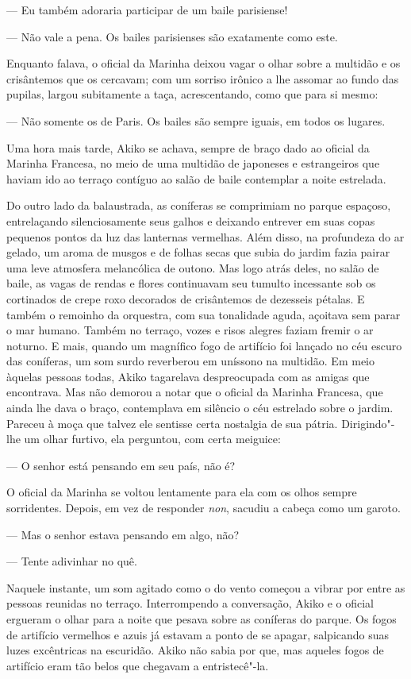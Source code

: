 --- Eu também adoraria participar de um baile parisiense!

--- Não vale a pena. Os bailes parisienses são exatamente como este.

Enquanto falava, o oficial da Marinha deixou vagar o olhar sobre a
multidão e os crisântemos que os cercavam; com um sorriso irônico a lhe
assomar ao fundo das pupilas, largou subitamente a taça, acrescentando,
como que para si mesmo:

--- Não somente os de Paris. Os bailes são sempre iguais, em todos os
lugares.

Uma hora mais tarde, Akiko se achava, sempre de braço dado ao oficial da 
Marinha Francesa, no meio de uma multidão de japoneses e estrangeiros
que haviam ido ao terraço contíguo ao salão de baile contemplar a noite
estrelada.

Do outro lado da balaustrada, as coníferas se comprimiam no parque
espaçoso, entrelaçando silenciosamente seus galhos e deixando entrever
em suas copas pequenos pontos da luz das lanternas vermelhas. Além
disso, na profundeza do ar gelado, um aroma de musgos e de folhas secas
que subia do jardim fazia pairar uma leve atmosfera melancólica de
outono. Mas logo atrás deles, no salão de baile, as vagas de rendas e
flores continuavam seu tumulto incessante sob os cortinados de crepe
roxo decorados de crisântemos de dezesseis pétalas. E também o remoinho
da orquestra, com sua tonalidade aguda, açoitava sem parar o mar
humano. Também no terraço, vozes e risos alegres faziam fremir o ar
noturno. E mais, quando um magnífico fogo de artifício foi lançado no
céu escuro das coníferas, um som surdo reverberou em uníssono na
multidão. Em meio àquelas pessoas todas, Akiko tagarelava despreocupada
com as amigas que encontrava. Mas não demorou a notar que o oficial da
Marinha Francesa, que ainda lhe dava o braço, contemplava em silêncio o
céu estrelado sobre o jardim. Pareceu à moça que talvez ele sentisse
certa nostalgia de sua pátria. Dirigindo"-lhe um olhar furtivo, ela
perguntou, com certa meiguice:

--- O senhor está pensando em seu país, não é?

O oficial da Marinha se voltou lentamente para ela com os olhos sempre
sorridentes. Depois, em vez de responder \textit{non}, sacudiu a cabeça como
um garoto.

--- Mas o senhor estava pensando em algo, não?

--- Tente adivinhar no quê.

Naquele instante, um som agitado como o do vento começou a vibrar por 
entre as pessoas reunidas no terraço. Interrompendo a conversação,
Akiko e o oficial ergueram o olhar para a noite que pesava sobre as
coníferas do parque. Os fogos de artifício vermelhos e azuis já estavam
a ponto de se apagar, salpicando suas luzes excêntricas na escuridão.
Akiko não sabia por que, mas aqueles fogos de artifício eram tão belos
que chegavam a entristecê"-la.


